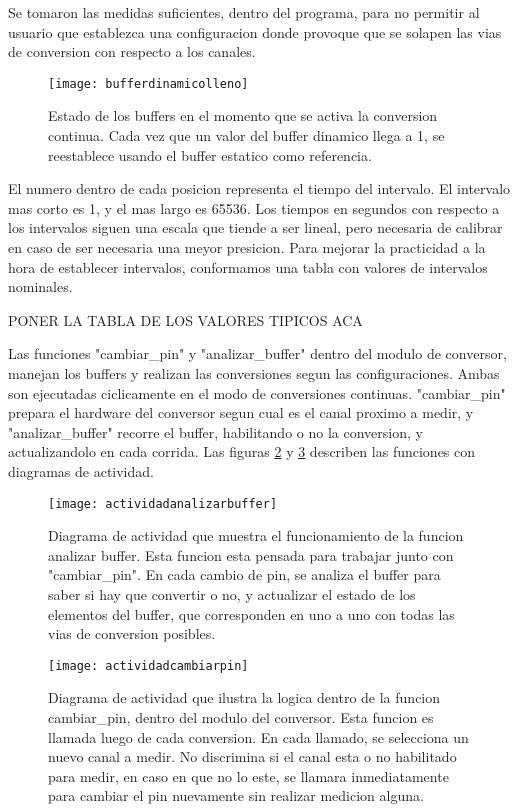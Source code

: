 Se tomaron las medidas suficientes, dentro del programa, para no permitir al usuario que establezca una configuracion donde provoque que se solapen las vias de conversion con respecto a los canales. 

\begin{figure}[h]
  \centering
  \texttt{[image: bufferdinamicolleno]}
  \caption{Estado de los buffers en el momento que se activa la conversion continua. Cada vez que un valor del buffer dinamico llega a 1, se reestablece usando el buffer estatico como referencia.}\label{fig:bufferdinamicolleno}
\end{figure}

El numero dentro de cada posicion representa el tiempo del intervalo. El intervalo mas corto es 1, y el mas largo es 65536. Los tiempos en segundos con respecto a los intervalos siguen una escala que tiende a ser lineal, pero necesaria de calibrar en caso de ser necesaria una meyor presicion. Para mejorar la practicidad a la hora de establecer intervalos, conformamos una tabla con valores de intervalos nominales.

PONER LA TABLA DE LOS VALORES TIPICOS ACA

Las funciones "cambiar\_pin" y "analizar\_buffer" dentro del modulo de conversor, manejan los buffers y realizan las conversiones segun las configuraciones. Ambas son ejecutadas ciclicamente en el modo de conversiones continuas. "cambiar\_pin" prepara el hardware del conversor segun cual es el canal proximo a medir, y "analizar\_buffer" recorre el buffer, habilitando o no la conversion, y actualizandolo en cada corrida. Las figuras \ref{fig:actividadanalizarbuffer} y \ref{fig:actividadcambiarpin} describen las funciones con diagramas de actividad.
 
\begin{figure}[h]
  \centering
  \texttt{[image: actividadanalizarbuffer]}
  \caption[Diagrama de actividad de la funcion analizar buffer]{Diagrama de actividad que muestra el funcionamiento de la funcion analizar buffer. Esta funcion esta pensada para trabajar junto con "cambiar\_pin". En cada cambio de pin, se analiza el buffer para saber si hay que convertir o no, y actualizar el estado de los elementos del buffer, que corresponden en uno a uno con todas las vias de conversion posibles.}\label{fig:actividadanalizarbuffer}
\end{figure}



\begin{figure}[h]
  \centering
  \texttt{[image: actividadcambiarpin]}
  \caption[Diagrama de actividad de la funcion cambiar pin]{Diagrama de actividad que ilustra la logica dentro de la funcion cambiar\_pin, dentro del modulo del conversor. Esta funcion es llamada luego de cada conversion. En cada llamado, se selecciona un nuevo canal a medir. No discrimina si el canal esta o no habilitado para medir, en caso en que no lo este, se llamara inmediatamente para cambiar el pin nuevamente sin realizar medicion alguna.}\label{fig:actividadcambiarpin}
\end{figure}

